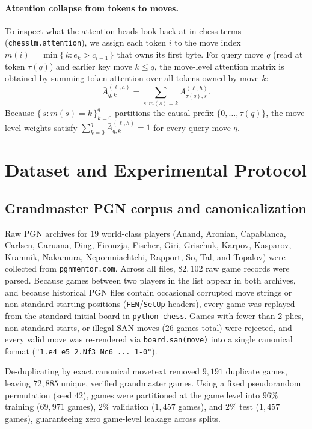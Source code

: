 \documentclass[11pt]{article}
\begin{document}
\paragraph{Attention collapse from tokens to moves.} To inspect what the attention heads look back at in chess terms (\texttt{chesslm.attention}), we assign each token $i$ to the move index $m(i) = \min\{\,k : e_k > c_{i-1}\,\}$ that owns its first byte. For query move $q$ (read at token $\tau(q)$) and earlier key move $k \le q$, the move-level attention matrix is obtained by summing token attention over all tokens owned by move $k$:
\begin{equation}
\bar{A}^{(\ell, h)}_{q, k} = \sum_{s : m(s) = k} A^{(\ell, h)}_{\tau(q), s}.
\label{eq:move-attn}
\end{equation}
Because $\{\,s : m(s) = k\,\}_{k=0}^q$ partitions the causal prefix $\{0, \dots, \tau(q)\}$, the move-level weights satisfy $\sum_{k=0}^q \bar{A}^{(\ell, h)}_{q, k} = 1$ for every query move $q$.

\section{Dataset and Experimental Protocol}
\label{sec:protocol}

\subsection{Grandmaster PGN corpus and canonicalization}

Raw PGN archives for $19$ world-class players (Anand, Aronian, Capablanca, Carlsen, Caruana, Ding, Firouzja, Fischer, Giri, Grischuk, Karpov, Kasparov, Kramnik, Nakamura, Nepomniachtchi, Rapport, So, Tal, and Topalov) were collected from \texttt{pgnmentor.com}. Across all files, $82{,}102$ raw game records were parsed. Because games between two players in the list appear in both archives, and because historical PGN files contain occasional corrupted move strings or non-standard starting positions (\texttt{FEN}/\texttt{SetUp} headers), every game was replayed from the standard initial board in \texttt{python-chess}. Games with fewer than $2$ plies, non-standard starts, or illegal SAN moves ($26$ games total) were rejected, and every valid move was re-rendered via \texttt{board.san(move)} into a single canonical format (\texttt{"1.e4 e5 2.Nf3 Nc6 ... 1-0"}).

De-duplicating by exact canonical movetext removed $9{,}191$ duplicate games, leaving $72{,}885$ unique, verified grandmaster games. Using a fixed pseudorandom permutation (seed $42$), games were partitioned at the game level into $96\%$ training ($69{,}971$ games), $2\%$ validation ($1{,}457$ games), and $2\%$ test ($1{,}457$ games), guaranteeing zero game-level leakage across splits.
\end{document}
